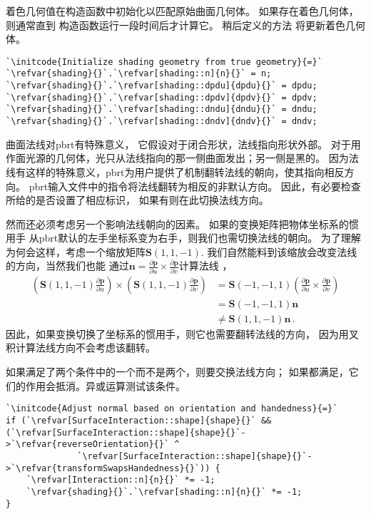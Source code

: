 着色几何值在构造函数中初始化以匹配原始曲面几何体。
如果存在着色几何体，则通常直到
构造函数运行一段时间后才计算它。
稍后定义的方法
将更新着色几何体。
\begin{lstlisting}
`\initcode{Initialize shading geometry from true geometry}{=}`
`\refvar{shading}{}`.`\refvar[shading::n]{n}{}` = n;
`\refvar{shading}{}`.`\refvar[shading::dpdu]{dpdu}{}` = dpdu;
`\refvar{shading}{}`.`\refvar[shading::dpdv]{dpdv}{}` = dpdv;
`\refvar{shading}{}`.`\refvar[shading::dndu]{dndu}{}` = dndu;
`\refvar{shading}{}`.`\refvar[shading::dndv]{dndv}{}` = dndv;
\end{lstlisting}

曲面法线对pbrt有特殊意义，
它假设对于闭合形状，法线指向形状外部。
对于用作面光源的几何体，光只从法线指向的那一侧曲面发出；另一侧是黑的。
因为法线有这样的特殊意义，pbrt为用户提供了机制翻转法线的朝向，使其指向相反方向。
pbrt输入文件中的指令将法线翻转为相反的非默认方向。
因此，有必要检查所给的是否设置了相应标识，
如果有则在此切换法线方向。

然而还必须考虑另一个影响法线朝向的因素。
如果的变换矩阵把物体坐标系的惯用手
从pbrt默认的左手坐标系变为右手，则我们也需切换法线的朝向。
为了理解为何会这样，考虑一个缩放矩阵$\bm S(1,1,-1)$.
我们自然能料到该缩放会改变法线的方向，当然我们也能
通过$\displaystyle\bm n=\frac{\partial\bm p}{\partial u}\times\frac{\partial\bm p}{\partial v}$计算法线
，
\begin{align*}
    \left(\bm S(1,1,-1)\frac{\partial\bm p}{\partial u}\right)\times\left(\bm S(1,1,-1)\frac{\partial\bm p}{\partial v}\right) & =\bm S(-1,-1,1)\left(\frac{\partial\bm p}{\partial u}\times\frac{\partial\bm p}{\partial v}\right) \\
                                                                                                                               & =\bm S(-1,-1,1)\bm n                                                                               \\
                                                                                                                               & \neq \bm S(1,1,-1)\bm n\, .
\end{align*}
因此，如果变换切换了坐标系的惯用手，则它也需要翻转法线的方向，
因为用叉积计算法线方向不会考虑该翻转。

如果满足了两个条件中的一个而不是两个，则要交换法线方向；
如果都满足，它们的作用会抵消。异或运算测试该条件。
\begin{lstlisting}
`\initcode{Adjust normal based on orientation and handedness}{=}`
if (`\refvar[SurfaceInteraction::shape]{shape}{}` && (`\refvar[SurfaceInteraction::shape]{shape}{}`->`\refvar{reverseOrientation}{}` ^
              `\refvar[SurfaceInteraction::shape]{shape}{}`->`\refvar{transformSwapsHandedness}{}`)) {
    `\refvar[Interaction::n]{n}{}` *= -1;
    `\refvar{shading}{}`.`\refvar[shading::n]{n}{}` *= -1;
}
\end{lstlisting}

